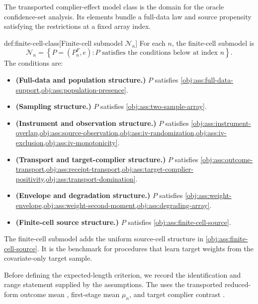 The transported complier-effect model class  is the domain for the oracle confidence-set analysis. Its elements bundle a full-data law and source propensity satisfying the restrictions at a fixed array index.

\begin{definitionv}{def:finite-cell-class}[Finite-cell submodel \(\mathcal N_n\)]
For each \(n\), the finite-cell submodel is
\[
\mathcal N_n
=
\left\{
P=(P_n^F,e):
P \text{ satisfies the conditions below at index } n
\right\}.
\]
The conditions are:
\begin{itemize}
\item \textbf{(Full-data and population structure.)} \(P\) satisfies \cref{obj:ass:full-data-support,obj:ass:population-presence}.
\item \textbf{(Sampling structure.)} \(P\) satisfies \cref{obj:ass:two-sample-array}.
\item \textbf{(Instrument and observation structure.)} \(P\) satisfies \cref{obj:ass:instrument-overlap,obj:ass:source-observation,obj:ass:iv-randomization,obj:ass:iv-exclusion,obj:ass:iv-monotonicity}.
\item \textbf{(Transport and target-complier structure.)} \(P\) satisfies \cref{obj:ass:outcome-transport,obj:ass:receipt-transport,obj:ass:target-complier-positivity,obj:ass:transport-domination}.
\item \textbf{(Envelope and degradation structure.)} \(P\) satisfies \cref{obj:ass:weight-envelope,obj:ass:weight-second-moment,obj:ass:degrading-array}.
\item \textbf{(Finite-cell source structure.)} \(P\) satisfies \cref{obj:ass:finite-cell-source}.
\end{itemize}
\end{definitionv}

The finite-cell submodel  adds the uniform source-cell structure in \cref{obj:ass:finite-cell-source}. It is the benchmark for procedures that learn target weights from the covariate-only target sample.

Before defining the expected-length criterion, we record the identification and range statement supplied by the assumptions. The  uses the transported reduced-form outcome mean , first-stage mean \(\mu_n\), and target complier contrast .

